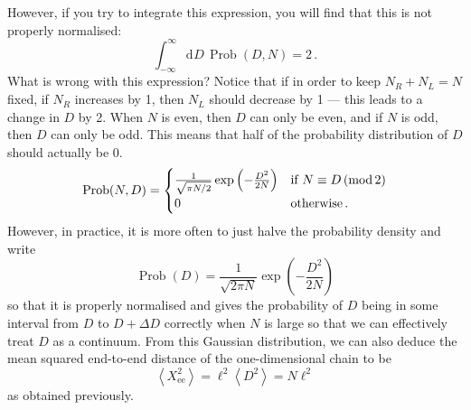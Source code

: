 \documentclass{article}
\theoremstyle{plain}\theoremheaderfont{\normalfont\bfseries}\theorembodyfont{\rmfamily}\theoremseparator{.}\newtheorem*{thm}{Theorem}\newtheorem*{law}{Law}\newtheorem*{pos}{Postulate}
\numberwithin{equation}{section}
\newcommand{\dd}[2][]{\mathrm{d}^{#1} #2\,}
\newcommand{\eval}[1]{\left\langle #1 \right\rangle}
\DeclareMathOperator{\Prob}{Prob}
\begin{document}
    However, if you try to integrate this expression, you will find that this is not properly normalised:
    \begin{equation}
        \int_{-\infty}^{\infty}\dd{D}\Prob(D,N)=2\,.
    \end{equation}
    What is wrong with this expression? Notice that if in order to keep \(N_R+N_L=N\) fixed, if \(N_R\) increases by 1, then \(N_L\) should decrease by 1 --- this leads to a change in \(D\) by 2. When \(N\) is even, then \(D\) can only be even, and if \(N\) is odd, then \(D\) can only be odd. This means that half of the probability distribution of \(D\) should actually be 0.
    \begin{equation}
        \Prob(N,D)=\begin{cases}
            \frac{1}{\sqrt{\pi N/2}}\exp\left(-\frac{D^2}{2N}\right) & \text{if } N\equiv D\,(\mathrm{mod}\, 2)\\
            0 & \text{otherwise\,.}
        \end{cases}
    \end{equation}
    However, in practice, it is more often to just halve the probability density and write
    \begin{equation}
        \Prob(D)=\frac{1}{\sqrt{2\pi N}}\exp\left(-\frac{D^2}{2N}\right)
    \end{equation}
    so that it is properly normalised and gives the probability of \(D\) being in some interval from \(D\) to \(D+\Delta D\) correctly when \(N\) is large so that we can effectively treat \(D\) as a continuum. From this Gaussian distribution, we can also deduce the mean squared end-to-end distance of the one-dimensional chain to be
    \begin{equation}\label{polymer_rms_distance}
        \eval{X_{\text{ee}}^2}=\ell^2\eval{D^2}=N\ell^2
    \end{equation}
    as obtained previously.
\end{document}
